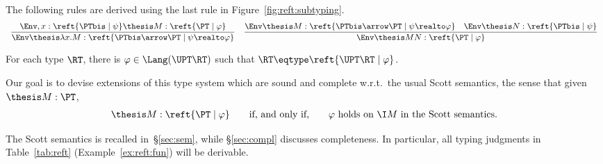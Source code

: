 \begin{example}
The following rules are derived using the 
last rule in Figure~\ref{fig:reft:subtyping}.
\[
\begin{array}{c}
\dfrac{\Env,x : \reft{\PTbis \mid \psi} \thesis M : \reft{\PT \mid \varphi}}
  {\Env \thesis \lambda x.M : \reft{\PTbis \arrow \PT \mid \psi \realto \varphi}}

\quad

\dfrac{\Env \thesis M : \reft{\PTbis \arrow \PT \mid \psi \realto \varphi}
  \quad
  \Env \thesis N : \reft{\PTbis \mid \psi}}
  {\Env \thesis M N : \reft{\PT \mid \varphi}}
\end{array}
\]
\end{example}


\begin{lemma}
\label{lem:reft}
For each type $\RT$, there is $\varphi \in \Lang(\UPT\RT)$
such that $\RT \eqtype \reft{\UPT\RT \mid \varphi}$.
\end{lemma}


Our goal is to devise extensions of this type system which
are sound and complete w.r.t.\ the usual Scott semantics,
the sense that given $\thesis M : \PT$,
\[
\begin{array}{c !{\quad}c!{\quad} c}
  \thesis M : \reft{\PT \mid \varphi}
& \text{if, and only if,}
& \text{$\varphi$ holds on $\I M$ in the Scott semantics.}
\end{array}
\]

\noindent
The Scott semantics is recalled in~\S\ref{sec:sem},
while \S\ref{sec:compl} discusses completeness.
In particular, all 
typing judgments in Table~\ref{tab:reft} (Example~\ref{ex:reft:fun})
will be derivable.





